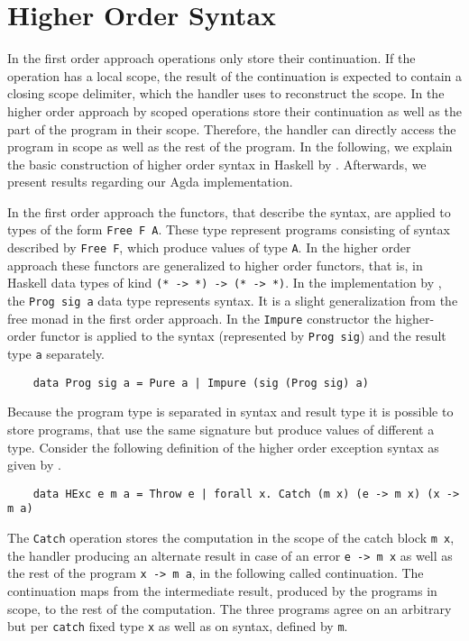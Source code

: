 \section{Higher Order Syntax}
\label{higher-order:syntax}

In the first order approach operations only store their continuation.
If the operation has a local scope, the result of the continuation is expected
to contain a closing scope delimiter, which the handler uses to reconstruct
the scope.
In the higher order approach by \textcite{DBLP:conf/haskell/WuSH14} scoped
operations store their continuation as well as the part of the program in their
scope.
Therefore, the handler can directly access the program in scope as well as the
rest of the program.
In the following, we explain the basic construction of higher order syntax in
Haskell by \textcite{DBLP:conf/haskell/WuSH14}.
Afterwards, we present results regarding our Agda implementation.

In the first order approach the functors, that describe the syntax, are applied
to types of the form \texttt{Free F A}.
These type represent programs consisting of syntax described by \texttt{Free F},
which produce values of type \texttt{A}.
In the higher order approach these functors are generalized to higher order
functors, that is, in Haskell data types of kind \texttt{(* -> *) -> (* -> *)}.
In the implementation by \textcite{DBLP:conf/haskell/WuSH14}, the
\texttt{Prog sig a} data type represents syntax.
It is a slight generalization from the free monad in the first order approach.
In the \texttt{Impure} constructor the higher-order functor is
applied to the syntax (represented by \texttt{Prog sig}) and the
result type \texttt{a} separately.

\begin{verbatim}
    data Prog sig a = Pure a | Impure (sig (Prog sig) a)
\end{verbatim}
Because the program type is separated in syntax and result type it is possible
to store programs, that use the same signature but produce values of different a
type.
Consider the following definition of the higher order exception syntax as given
by \textcite{DBLP:conf/haskell/WuSH14}.

\begin{verbatim}
    data HExc e m a = Throw e | forall x. Catch (m x) (e -> m x) (x -> m a)
\end{verbatim}
The \texttt{Catch} operation stores the computation in the scope of the catch
block \texttt{m x}, the handler producing an alternate result in case of an
error \texttt{e -> m x} as well as the rest of the program \texttt{x -> m a}, in
the following called continuation.
The continuation maps from the intermediate result, produced by the programs in
scope, to the rest of the computation.
The three programs agree on an arbitrary but per \texttt{catch} fixed type
\texttt{x} as well as on syntax, defined by \texttt{m}.

